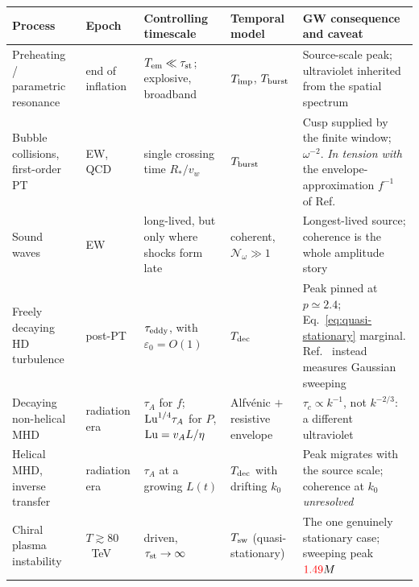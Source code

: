 \documentclass[10pt,prd,aps,nobibnotes,superscriptaddress,preprintnumbers,notitlepage]{revtex4-1}
\newcommand{\add}[1]{{\color{red}#1}}
\newcommand{\add}[1]{#1}
\begin{document}
\begin{table}[ht]
  \centering
  \begin{tabular}{@{}p{} p{} p{} p{} p{}@{}}
  \hline\hline
  Process & Epoch & Controlling timescale & Temporal model & GW consequence and caveat \\
  \hline
  Preheating / parametric resonance \cite{Khlebnikov:1997di} &
    end of inflation &
    $T_{\rm em}\ll\tau_{\rm st}$; explosive, broadband &
    $T_{\rm imp}$, $T_{\rm burst}$ &
    Source-scale peak; ultraviolet inherited from the spatial spectrum \\
  Bubble collisions, first-order PT \cite{Caprini:2018mtu,Huber:2008hg,Cutting:2018tjt} &
    EW, QCD &
    single crossing time $R_*/v_w$ &
    $T_{\rm burst}$ &
    Cusp supplied by the finite window; $\omega^{-2}$. \emph{In tension with}
    the envelope-approximation $f^{-1}$ of Ref.~\cite{Huber:2008hg} \\
  Sound waves \cite{Hindmarsh:2013xza,Hindmarsh:2017gnf,RoperPol:2023dzg} &
    EW &
    long-lived, but only where shocks form late \cite{Ellis:2020awk} &
    coherent, $\mathcal{N}_\omega\gg1$ &
    Longest-lived source; coherence is the whole amplitude story \\
  Freely decaying HD turbulence \cite{Auclair:2022jod,Brandenburg:2016odr,Dahl:2024eup} &
    post-PT &
    $\tau_{\rm eddy}$, with $\varepsilon_0=O(1)$ &
    $T_{\rm dec}$ &
    Peak pinned at $p\simeq2.4$; Eq.~\eqref{eq:quasi-stationary} marginal.
    Ref.~\cite{Auclair:2022jod} instead measures Gaussian sweeping \\
  Decaying non-helical MHD \cite{Hosking:2020wom,Hosking:2022umv,Brandenburg:2024tyi} &
    radiation era &
    $\tau_A$ for $f$; ${\rm Lu}^{1/4}\tau_A$ for $P$, ${\rm Lu}=v_AL/\eta$ &
    Alfv\'enic $+$ resistive envelope &
    $\tau_c\propto k^{-1}$, not $k^{-2/3}$: a different ultraviolet \\
  Helical MHD, inverse transfer
    \cite{Christensson:2000sp,Brandenburg:2014mwa,Kahniashvili:2008pe} &
    radiation era &
    $\tau_A$ at a growing $L(t)$ &
    $T_{\rm dec}$ with drifting $k_0$ &
    Peak migrates with the source scale; coherence at $k_0$ \emph{unresolved} \\
  Chiral plasma instability \cite{Joyce:1997uy,Brandenburg:1996fc} &
    $T\gtrsim80$~TeV &
    driven, $\tau_{\rm st}\to\infty$ &
    $T_{\rm sw}$ (quasi-stationary) &
    The one genuinely stationary case; sweeping peak $\add{1.49}M$ \\

\end{tabular}
\end{table}
\end{document}
